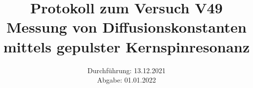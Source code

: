 \titlehead{\texttt{[image: resources/logo.jpg]}}
\title{Protokoll zum Versuch V49 \\ Messung von Diffusionskonstanten mittels gepulster Kernspinresonanz }
\date{Durchführung: 13.12.2021 \\ Abgabe:  01.01.2022}

